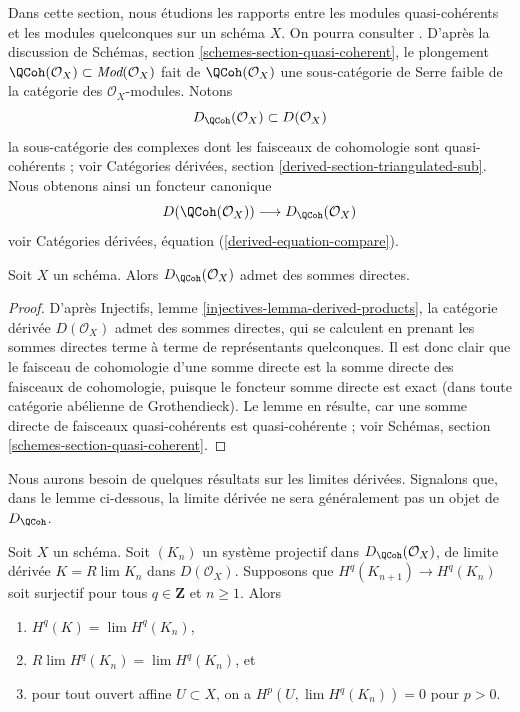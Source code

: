 \noindent
Dans cette section, nous étudions les rapports entre les modules quasi-cohérents
et les modules quelconques sur un schéma $X$. On pourra consulter
\cite[appendice B]{TT}. D'après la discussion de
Schémas, section \ref{schemes-section-quasi-coherent},
le plongement
$\QCoh(\mathcal{O}_X) \subset \textit{Mod}(\mathcal{O}_X)$
fait de $\QCoh(\mathcal{O}_X)$ une sous-catégorie de Serre faible de
la catégorie des $\mathcal{O}_X$-modules. Notons
$$
D_\QCoh(\mathcal{O}_X) \subset D(\mathcal{O}_X)
$$
la sous-catégorie des complexes dont les faisceaux de cohomologie sont quasi-cohérents ; voir
Catégories dérivées, section \ref{derived-section-triangulated-sub}.
Nous obtenons ainsi un foncteur canonique
\begin{equation}
\label{equation-compare}
D(\QCoh(\mathcal{O}_X))
\longrightarrow
D_\QCoh(\mathcal{O}_X)
\end{equation}
voir Catégories dérivées, équation (\ref{derived-equation-compare}).

\begin{lemma}
\label{lemma-quasi-coherence-direct-sums}
Soit $X$ un schéma. Alors $D_\QCoh(\mathcal{O}_X)$
admet des sommes directes.
\end{lemma}

\begin{proof}
D'après Injectifs, lemme \ref{injectives-lemma-derived-products},
la catégorie dérivée $D(\mathcal{O}_X)$ admet des sommes directes,
qui se calculent en prenant les sommes directes terme à terme de représentants quelconques.
Il est donc clair que le faisceau de cohomologie d'une somme directe est la
somme directe des faisceaux de cohomologie, puisque le foncteur somme directe
est exact (dans toute catégorie abélienne de Grothendieck). Le lemme
en résulte, car une somme directe de faisceaux quasi-cohérents est quasi-cohérente ; voir
Schémas, section \ref{schemes-section-quasi-coherent}.
\end{proof}

\noindent
Nous aurons besoin de quelques résultats sur les limites dérivées. Signalons
que, dans le lemme ci-dessous, la limite dérivée ne sera généralement pas
un objet de $D_\QCoh$.

\begin{lemma}
\label{lemma-Rlim-quasi-coherent}
Soit $X$ un schéma. Soit $(K_n)$ un système projectif dans
$D_\QCoh(\mathcal{O}_X)$, de limite dérivée
$K = R\lim K_n$ dans $D(\mathcal{O}_X)$. Supposons que $H^q(K_{n + 1}) \to H^q(K_n)$
soit surjectif pour tous $q \in \mathbf{Z}$ et $n \geq 1$.
Alors
\begin{enumerate}
\item $H^q(K) = \lim H^q(K_n)$,
\item $R\lim H^q(K_n) = \lim H^q(K_n)$, et
\item pour tout ouvert affine $U \subset X$, on a
$H^p(U, \lim H^q(K_n)) = 0$ pour $p > 0$.
\end{enumerate}
\end{lemma}


